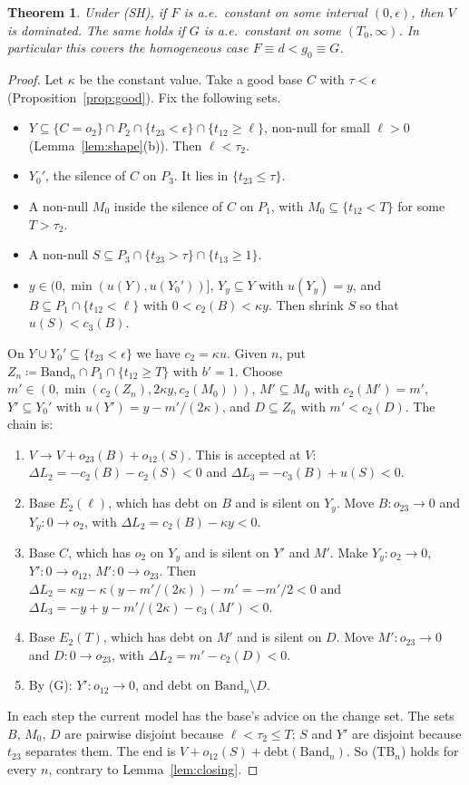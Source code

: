 \documentclass[11pt]{article}
\newtheorem{theorem}{Theorem}
\theoremstyle{definition}\newtheorem{definition}[theorem]{Definition}
\theoremstyle{remark}\newtheorem{remark}[theorem]{Remark}
\begin{document}
\begin{theorem}\label{thm:flat}
Under (SH), if $F$ is a.e.\ constant on some interval $(0,\epsilon)$, then $V$
is dominated. The same holds if $G$ is a.e.\ constant on some
$(T_0,\infty)$. In particular this covers the homogeneous case
$F\equiv d<g_0\equiv G$.
\end{theorem}
\begin{proof}
Let $\kappa$ be the constant value. Take a good base $C$ with $\tau<\epsilon$
(Proposition~\ref{prop:good}). Fix the following sets.
\begin{itemize}[leftmargin=*,itemsep=1pt]
\item $Y\subseteq\{C=o_2\}\cap P_2\cap\{t_{23}<\epsilon\}\cap\{t_{12}\ge\ell\}$,
non-null for small $\ell>0$ (Lemma~\ref{lem:shape}(b)). Then $\ell<\tau_2$.
\item $Y_0'$, the silence of $C$ on $P_3$. It lies in $\{t_{23}\le\tau\}$.
\item A non-null $M_0$ inside the silence of $C$ on $P_1$, with
$M_0\subseteq\{t_{12}<T\}$ for some $T>\tau_2$.
\item A non-null $S\subseteq P_3\cap\{t_{23}>\tau\}\cap\{t_{13}\ge1\}$.
\item $y\in(0,\min(u(Y),u(Y_0'))]$, $Y_y\subseteq Y$ with $u(Y_y)=y$, and
$B\subseteq P_1\cap\{t_{12}<\ell\}$ with $0<c_2(B)<\kappa y$. Then shrink $S$
so that $u(S)<c_3(B)$.
\end{itemize}
On $Y\cup Y_0'\subseteq\{t_{23}<\epsilon\}$ we have $c_2=\kappa u$. Given
$n$, put $Z_n\coloneqq\mathrm{Band}_n\cap P_1\cap\{t_{12}\ge T\}$ with $b'=1$.
Choose $m'\in(0,\min(c_2(Z_n),2\kappa y,c_2(M_0)))$, $M'\subseteq M_0$ with
$c_2(M')=m'$, $Y'\subseteq Y_0'$ with $u(Y')=y-m'/(2\kappa)$, and
$D\subseteq Z_n$ with $m'<c_2(D)$. The chain is:
\begin{enumerate}[label=\arabic*.,leftmargin=*,itemsep=2pt]
\item $V\to V+o_{23}(B)+o_{12}(S)$. This is accepted at $V$:
$\Delta L_2=-c_2(B)-c_2(S)<0$ and $\Delta L_3=-c_3(B)+u(S)<0$.
\item Base $E_2(\ell)$, which has debt on $B$ and is silent on $Y_y$. Move
$B\colon o_{23}\to0$ and $Y_y\colon0\to o_2$, with
$\Delta L_2=c_2(B)-\kappa y<0$.
\item Base $C$, which has $o_2$ on $Y_y$ and is silent on $Y'$ and $M'$.
Make $Y_y\colon o_2\to0$, $Y'\colon0\to o_{12}$, $M'\colon0\to o_{23}$. Then
$\Delta L_2=\kappa y-\kappa(y-m'/(2\kappa))-m'=-m'/2<0$ and
$\Delta L_3=-y+y-m'/(2\kappa)-c_3(M')<0$.
\item Base $E_2(T)$, which has debt on $M'$ and is silent on $D$. Move
$M'\colon o_{23}\to0$ and $D\colon0\to o_{23}$, with
$\Delta L_2=m'-c_2(D)<0$.
\item By (G): $Y'\colon o_{12}\to0$, and debt on $\mathrm{Band}_n\setminus D$.
\end{enumerate}
In each step the current model has the base's advice on the change set. The
sets $B$, $M_0$, $D$ are pairwise disjoint because $\ell<\tau_2\le T$; $S$
and $Y'$ are disjoint because $t_{23}$ separates them. The end is
$V+o_{12}(S)+\mathrm{debt}(\mathrm{Band}_n)$. So (TB$_n$) holds for every
$n$, contrary to Lemma~\ref{lem:closing}.


\end{proof}
\end{document}
